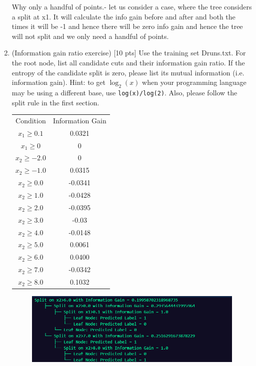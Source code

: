\documentclass[a4paper]{article}
\theoremstyle{definition}
\begin{document}
\begin{enumerate}
Why only a handful of points.- let us consider a case, where the tree considers a split at x1. It will calculate the info gain before and after and both the times it will be -1 and hence there will be zero info gain and hence the tree will not split and we only need a handful of points.



\item (Information gain ratio exercise)  [10 pts] Use the training set Druns.txt.  For the root node, list all candidate cuts and their information gain ratio. If the entropy of the candidate split is zero, please list its mutual information (i.e. information gain). Hint: to get $\log_2(x)$ when your programming language may be using a different base, use \verb|log(x)/log(2)|. Also, please follow the split rule in the first section. \\


\begin{tabular}{c|c}

	Condition & Information Gain \\

	$x_1 \geq 0.1$ & 0.0321 \\
	$x_1 \geq 0$ & 0 \\
	$x_2 \geq -2.0$ & 0 \\
	$x_2 \geq -1.0$ & 0.0315 \\
	$x_2 \geq 0.0$ & -0.0341 \\
	$x_2 \geq 1.0$ & -0.0428 \\
	$x_2 \geq 2.0$ & -0.0395 \\
	$x_2 \geq 3.0$ & -0.03 \\
	$x_2 \geq 4.0$ & -0.0148 \\
	$x_2 \geq 5.0$ & 0.0061 \\
	$x_2 \geq 6.0$ & 0.0400 \\
	$x_2 \geq 7.0$ & -0.0342 \\
	$x_2 \geq 8.0$ & 0.1032 \\

\end{tabular}

\begin{figure}[h!]
	\centering
	\includegraphics[width=1.0\textwidth]{q3.png}  
	\captionsetup{labelformat=empty}
	\caption{}
	\label{fig:my_label}
\end{figure}




\end{enumerate}
\end{document}
